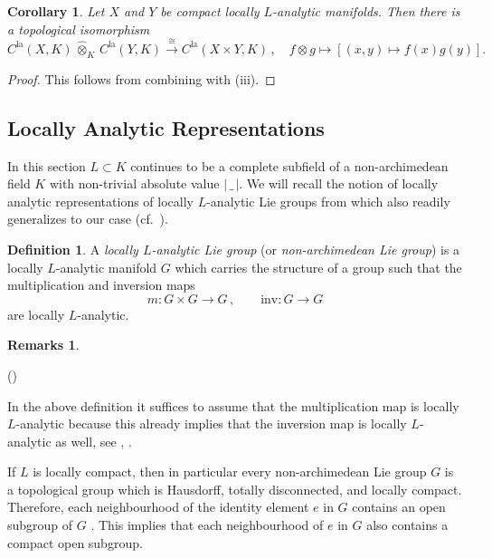 \documentclass[a4paper, reqno, 10pt]{amsart}
\newtheorem{corollary}[theorem]{Corollary}
\theoremstyle{definition}
\newtheorem{definition}[theorem]{Definition}
\newtheorem{remarks}[theorem]{Remarks}
\newenvironment{altenumerate}
	{\begin{list}
		{\textup{(\theenumi)} }
		{\usecounter{enumi}
			\setlength{\labelwidth}{0pt}
			\setlength{\labelsep}{0pt}
			\setlength{\leftmargin}{0pt}
			\setlength{\itemsep}{0pt}
			\setlength{\topsep}{0pt}
		\renewcommand{\theenumi}{\roman{enumi}}
		}}
	{\end{list}}
\numberwithin{equation}{section}
\newcommand{\abs}[1]{{\lvert{#1}\rvert}}
\newcommand{\blank}{{\,\_\,}}
\newcommand{\cotimes}[1]{{\,\widehat{\otimes}_{#1}\,}}
\newcommand{\inv}{{\mathrm{inv}}}
\newcommand{\la}{{\mathrm{la}}}
\newcommand{\lra}{\longrightarrow}
\newcommand{\lto}{\longmapsto}
\newcommand{\mto}{\mapsto}
\begin{document}
\begin{corollary}\label{Cor 1 - Locally analytic functions on product of manifolds}
	Let $X$ and $Y$ be compact locally $L$-analytic manifolds.
	Then there is a topological isomorphism
	\begin{equation*}
		C^\la(X,K) \cotimes{K} C^\la(Y,K)\overset{\cong}{\lra} C^\la(X\times Y, K)  \,,\quad f \otimes g \lto \left[ (x,y) \mto f(x) g(y) \right] .
	\end{equation*}
\end{corollary}
\begin{proof}
	This follows from combining  with  (iii).
\end{proof}



\subsection{Locally Analytic Representations}

In this section $L \subset K$ continues to be a complete subfield of a non-archimedean field $K$ with non-trivial absolute value $\abs{\blank}$.
We will recall the notion of locally analytic representations of locally $L$-analytic Lie groups from \cite{FeauxdeLacroix99TopDarstpAdischLieGrp} which also readily generalizes to our case (cf.\ \cite[Part I, App.\ A]{Graef21BoundDistr}).



\begin{definition}\label{Def 1 - Definition Lie group}
	A \textit{locally $L$-analytic Lie group} (or \textit{non-archimedean Lie group}) is a locally $L$-analytic manifold $G$ which carries the structure of a group such that the multiplication and inversion maps
	\begin{equation*}
		m \colon G \times G \lra G \,,\qquad \inv\colon G \lra G
	\end{equation*}
	are locally $L$-analytic.
\end{definition}

\begin{remarks}
	\begin{altenumerate}
		\item
		In the above definition it suffices to assume that the multiplication map is locally $L$-analytic because this already implies that the inversion map is locally $L$-analytic as well, see \cite[5.12.1]{Bourbaki07VarDiffAnFasciDeResult}, \cite[Prop.\ 13.6]{Schneider11pAdicLieGrps}.
		\item
		If $L$ is locally compact, then in particular every non-archimedean Lie group $G$ is a topological group which is Hausdorff, totally disconnected, and locally compact.
		Therefore, each neighbourhood of the identity element $e$ in $G$ contains an open subgroup of $G$ \cite[Ch.\ III.\ \S 4.6, Cor.\ 1]{Bourbaki66GenTop1}.
		This implies that each neighbourhood of $e$ in $G$ also contains a compact open subgroup.
	\end{altenumerate}	
\end{remarks}
\end{document}
